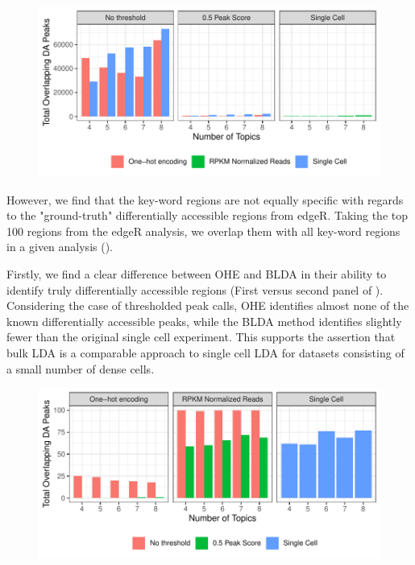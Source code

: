 \begin{figure}
  \centering
  \includegraphics[]{plot/ch4/pb_diff_acc_tot.pdf}

  \label{fig:pb_tot_number}
\end{figure}

However, we find that the key-word regions are not equally specific with regards to the "ground-truth" differentially accessible regions from edgeR. Taking the top 100 regions from the edgeR analysis, we overlap them with all key-word regions in a given analysis (). 

Firstly, we find a clear difference between OHE and BLDA in their ability to identify truly differentially accessible regions (First versus second panel of ). Considering the case of thresholded peak calls, OHE identifies almost none of the known differentially accessible peaks, while the BLDA method identifies slightly fewer than the original single cell experiment. This supports the assertion that bulk LDA is a comparable approach to single cell LDA for datasets consisting of a small number of dense cells. 

\begin{figure}
  \centering
  \includegraphics[]{plot/ch4/pb_diff_acc_olap.pdf}
  \label{fig:pb_olap_number}
\end{figure}

